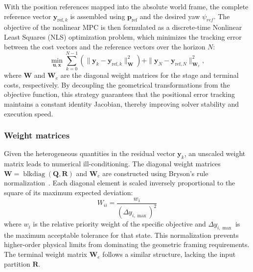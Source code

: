 With the position references mapped into the absolute world frame, the complete reference vector $\mathbf{y}_{\text{ref},k}$ is assembled using $\mathbf{p}_{\text{ref}}$ and the desired yaw $\psi_{ref}$. The objective of the nonlinear MPC is then formulated as a discrete-time Nonlinear Least Squares (NLS) optimization problem, which minimizes the tracking error between the cost vectors and the reference vectors over the horizon $N$:
\begin{equation}
    \min_{\mathbf{u}, \mathbf{x}} \sum_{k=0}^{N-1} \left( \|\mathbf{y}_k - \mathbf{y}_{\text{ref},k}\|_{\mathbf{W}}^2 \right) + \|\mathbf{y}_N - \mathbf{y}_{\text{ref},N}\|_{\mathbf{W}_e}^2,
\end{equation}
where $\mathbf{W}$ and $\mathbf{W}_e$ are the diagonal weight matrices for the stage and terminal costs, respectively. By decoupling the geometrical transformations from the objective function, this strategy guarantees that the positional error tracking maintains a constant identity Jacobian, thereby improving solver stability and execution speed.
\subsubsection{Weight matrices}
Given the heterogeneous quantities in the residual vector $\mathbf{y}_k$, an unscaled weight matrix leads to numerical ill-conditioning. The diagonal weight matrices $\mathbf{W} = \operatorname{blkdiag}(\mathbf{Q}, \mathbf{R})$ and $\mathbf{W}_e$ are constructed using Bryson's rule normalization~\cite{bryson1975applied}. Each diagonal element is scaled inversely proportional to the square of its maximum expected deviation:
\begin{equation}
    W_{ii} = \frac{w_i}{(\Delta y_{i, \max})^2}
\end{equation}
where $w_i$ is the relative priority weight of the specific objective and $\Delta y_{i, \max}$ is the maximum acceptable tolerance for that state. This normalization prevents higher-order physical limits from dominating the geometric framing requirements. The terminal weight matrix $\mathbf{W}_e$ follows a similar structure, lacking the input partition $\mathbf{R}$.


